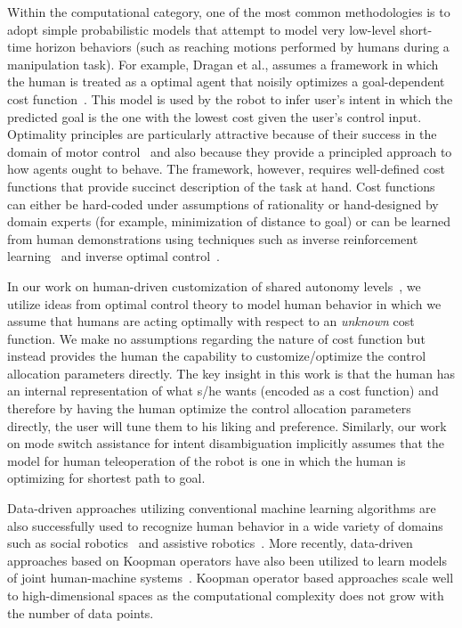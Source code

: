 \documentclass[12pt]{article}
\begin{document}
Within the computational category, one of the most common methodologies is to adopt simple probabilistic models that attempt to model very low-level short-time horizon behaviors (such as reaching motions performed by humans during a manipulation task). For example, Dragan et al., assumes a framework in which the human is treated as a optimal agent that noisily optimizes a goal-dependent cost function~\cite{dragan2013policy}. This model is used by the robot to infer user's intent in which the predicted goal is the one with the lowest cost given the user's control input. Optimality principles are particularly attractive because of their success in the domain of motor control~\cite{uno1989formation} and also because they provide a principled approach to how agents ought to behave. The framework, however, requires well-defined cost functions that provide succinct description of the task at hand. Cost functions can either be hard-coded under assumptions of rationality or hand-designed by domain experts (for example, minimization of distance to goal) or can be learned from human demonstrations using techniques such as inverse reinforcement learning~\cite{ziebart2008maximum} and inverse optimal control~\cite{dvijotham2010inverse}.

In our work on human-driven customization of shared autonomy levels~\cite{gopinath2017human}, we utilize ideas from optimal control theory to model human behavior in which we assume that humans are acting optimally with respect to an \textit{unknown} cost function. We make no assumptions regarding the nature of cost function but instead provides the human the capability to customize/optimize the control allocation parameters directly. The key insight in this work is that the human has an internal representation of what s/he wants (encoded as a cost function) and therefore by having the human optimize the control allocation parameters directly, the user will tune them to his liking and preference. Similarly, our work on mode switch assistance for intent disambiguation implicitly assumes that the model for human teleoperation of the robot is one in which the human is optimizing for shortest path to goal.

Data-driven approaches utilizing conventional machine learning algorithms are also successfully used to recognize human behavior in a wide variety of domains such as social robotics~\cite{mataric2007socially} and assistive robotics~\cite{goil2013using}. More recently, data-driven approaches based on Koopman operators have also been utilized to learn models of joint human-machine systems~\cite{broad2018learning}. Koopman operator based approaches scale well to high-dimensional spaces as the computational complexity does not grow with the number of data points. 
\end{document}
